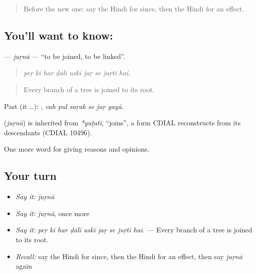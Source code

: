 \label{lesson:HI-C343-jurna}



\begin{quote}
Before the new one: say the Hindi for since, then the Hindi for an effect.
\end{quote}

\subsection*{You'll want to know: }
\textbf{} — \emph{juṛnā} — \textquotedblleft{}to be joined, to be linked\textquotedblright{}.

\begin{quote}
        
\end{quote}

\begin{quote}
\emph{peṛ kī har ḍālī uskī jaṛ se juṛtī hai.}
\end{quote}

\begin{quote}
Every branch of a tree is joined to its root.
\end{quote}

Past (it …):      , \emph{vah pul saṛak se juṛ gayā}.

\begin{cousinweb}
\textbf{} (\emph{juṛnā}) is inherited from \emph{*yuṭati}, \textquotedblleft{}joins\textquotedblright{}, a form CDIAL reconstructs from its descendants (CDIAL 10496).
\end{cousinweb}

\begin{grammarlens}[title={What you've built}]
One more word for giving reasons and opinions.
\end{grammarlens}

\subsection*{Your turn}
\begin{itemize}
\raggedright
  \item \emph{Say it:} \emph{juṛnā}
  \item \emph{Say it:} \emph{juṛnā}, once more
  \item \emph{Say it:} \emph{peṛ kī har ḍālī uskī jaṛ se juṛtī hai.} — Every branch of a tree is joined to its root.
  \item \emph{Recall:} say the Hindi for since, then the Hindi for an effect, then say \emph{juṛnā} again
\end{itemize}

